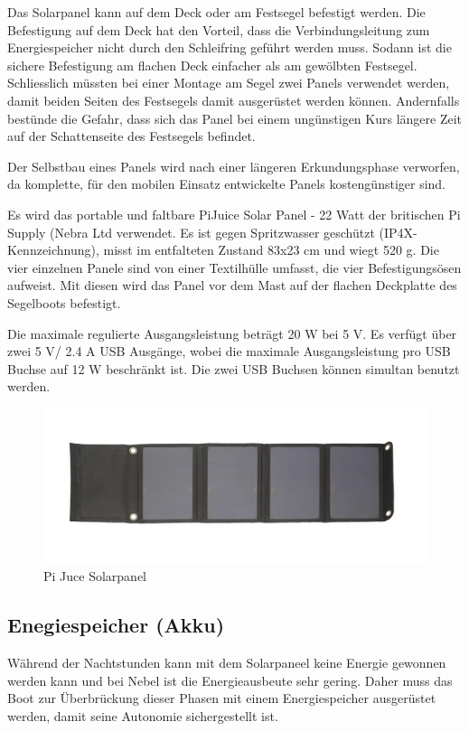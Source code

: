 Das Solarpanel kann auf dem Deck oder am Festsegel befestigt werden. Die Befestigung auf dem Deck hat den Vorteil, dass die Verbindungsleitung zum Energiespeicher nicht durch den Schleifring geführt werden muss. Sodann ist die sichere Befestigung am flachen Deck einfacher als am gewölbten Festsegel. Schliesslich müssten bei einer Montage am Segel zwei Panels verwendet werden, damit beiden Seiten des Festsegels damit ausgerüstet werden können. Andernfalls bestünde die Gefahr, dass sich das Panel bei einem ungünstigen Kurs längere Zeit auf der Schattenseite des Festsegels befindet.  

Der Selbstbau eines Panels wird nach einer längeren Erkundungsphase verworfen, da komplette, für den mobilen Einsatz entwickelte Panels kostengünstiger sind.   

Es wird das portable und faltbare PiJuice Solar Panel - 22 Watt der britischen Pi Supply (Nebra Ltd verwendet. Es ist gegen Spritzwasser geschützt (IP4X-Kennzeichnung), misst im entfalteten Zustand 83x23 cm und wiegt 520 g. Die vier einzelnen Panele sind von einer Textilhülle umfasst, die vier Befestigungsösen aufweist. Mit diesen wird das Panel vor dem Mast auf der flachen Deckplatte des Segelboots befestigt.

Die maximale regulierte Ausgangsleistung beträgt 20 W bei 5 V. Es verfügt über zwei 5 V/ 2.4 A USB Ausgänge, wobei die maximale Ausgangsleistung pro USB Buchse auf 12 W beschränkt ist. Die zwei USB Buchsen können simultan benutzt werden.
\begin{figure}[H]
\centering
    \includegraphics[width=1\linewidth]{assets/Pi juce.png}
    \caption{Pi Juce Solarpanel}
    \label{fig:enter-label}
\end{figure}
\subsection{Enegiespeicher (Akku)}
Während der Nachtstunden kann mit dem Solarpaneel keine Energie gewonnen werden kann und bei Nebel ist die Energieausbeute sehr gering. Daher muss das Boot zur Überbrückung dieser Phasen mit einem Energiespeicher ausgerüstet werden, damit seine Autonomie sichergestellt ist.


